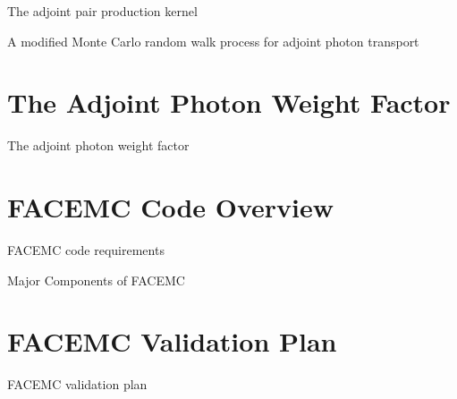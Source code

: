 \documentclass{beamer}
\begin{document}
\begin{frame}{The adjoint pair production kernel}

\end{frame}

\begin{frame}{A modified Monte Carlo random walk process for adjoint photon transport}

\end{frame}

\section{The Adjoint Photon Weight Factor }
\begin{frame}{The adjoint photon weight factor}

\end{frame}

\section{FACEMC Code Overview}
\begin{frame}{FACEMC code requirements}

\end{frame}

\begin{frame}{Major Components of FACEMC}

\end{frame}

\section{FACEMC Validation Plan}
\begin{frame}{FACEMC validation plan}

\end{frame}
\end{document}
